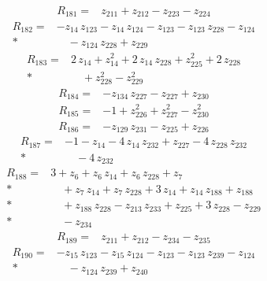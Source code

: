 \documentclass[10pt]{article}
\begin{document}
\begin{align*}
R_{181}={}& z_{211} + z_{212} - z_{223} - z_{224}
\end{align*}
\begin{align*}
R_{182}={}& - z_{14}\,z_{123} - z_{14}\,z_{124} - z_{123} - z_{123}\,z_{228} - z_{124} \\*
&\quad - z_{124}\,z_{228} + z_{229}
\end{align*}
\begin{align*}
R_{183}={}& 2\,z_{14} + z_{14}^{2} + 2\,z_{14}\,z_{228} + z_{225}^{2} + 2\,z_{228} \\*
&\quad + z_{228}^{2} - z_{229}^{2}
\end{align*}
\begin{align*}
R_{184}={}& - z_{134}\,z_{227} - z_{227} + z_{230}
\end{align*}
\begin{align*}
R_{185}={}& - 1 + z_{226}^{2} + z_{227}^{2} - z_{230}^{2}
\end{align*}
\begin{align*}
R_{186}={}& - z_{129}\,z_{231} - z_{225} + z_{226}
\end{align*}
\begin{align*}
R_{187}={}& - 1 - z_{14} - 4\,z_{14}\,z_{232} + z_{227} - 4\,z_{228}\,z_{232} \\*
&\quad - 4\,z_{232}
\end{align*}
\begin{align*}
R_{188}={}& 3 + z_{6} + z_{6}\,z_{14} + z_{6}\,z_{228} + z_{7} \\*
&\quad + z_{7}\,z_{14} + z_{7}\,z_{228} + 3\,z_{14} + z_{14}\,z_{188} + z_{188} \\*
&\quad + z_{188}\,z_{228} - z_{213}\,z_{233} + z_{225} + 3\,z_{228} - z_{229} \\*
&\quad - z_{234}
\end{align*}
\begin{align*}
R_{189}={}& z_{211} + z_{212} - z_{234} - z_{235}
\end{align*}
\begin{align*}
R_{190}={}& - z_{15}\,z_{123} - z_{15}\,z_{124} - z_{123} - z_{123}\,z_{239} - z_{124} \\*
&\quad - z_{124}\,z_{239} + z_{240}
\end{align*}
\end{document}
